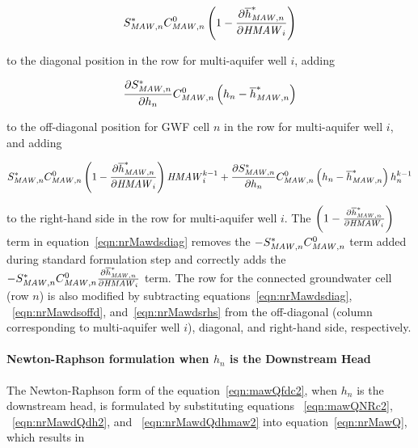 \begin{equation}
	\label{eqn:nrMawdsdiag}
	S_{\mathit{MAW},n}^* C_{\mathit{MAW},n}^0 \left( 1 - \frac{\partial \overline{h}^*_{\mathit{MAW},n}}{{\partial \mathit{HMAW}_i}} \right)
\end{equation}

\noindent to the diagonal position in the row for multi-aquifer well $i$, adding

\begin{equation}
	\label{eqn:nrMawdsoffd}
	\frac{\partial S_{\mathit{MAW},n}^*}{\partial h_n} C_{\mathit{MAW},n}^0 \left( h_n - \overline{h}^*_{\mathit{MAW},n} \right)
\end{equation}

\noindent to the off-diagonal position for GWF cell $n$ in the row for multi-aquifer well $i$, and adding

\begin{equation}
	\label{eqn:nrMawdsrhs}
	S_{\mathit{MAW},n}^* C_{\mathit{MAW},n}^0 \left( 1 - \frac{\partial \overline{h}^*_{\mathit{MAW},n}}{{\partial \mathit{HMAW}_i}} \right) \mathit{HMAW}_i^{k-1} + \frac{\partial S_{\mathit{MAW},n}^*}{\partial h_n} C_{\mathit{MAW},n}^0 \left( h_n - \overline{h}^*_{\mathit{MAW},n} \right) h_n^{k-1}
\end{equation}

\noindent to the right-hand side in the row for multi-aquifer well $i$. The $\left( 1 - \frac{\partial \overline{h}^*_{\mathit{MAW},n}}{{\partial \mathit{HMAW}_i}} \right)$ term in equation~\ref{eqn:nrMawdsdiag} removes the $-S_{\mathit{MAW},n}^* C_{\mathit{MAW},n}^0$ term added during standard formulation step and correctly adds the $-S_{\mathit{MAW},n}^* C_{\mathit{MAW},n}^0 \frac{\partial \overline{h}^*_{\mathit{MAW},n}}{{\partial \mathit{HMAW}_i}}$ term. The row for the connected groundwater cell (row $n$) is also modified by subtracting equations~\ref{eqn:nrMawdsdiag}, ~\ref{eqn:nrMawdsoffd}, and~\ref{eqn:nrMawdsrhs} from the off-diagonal (column corresponding to multi-aquifer well $i$), diagonal, and right-hand side, respectively.

\paragraph{Newton-Raphson formulation when $h_n$ is the Downstream Head}

The Newton-Raphson form of the equation~\ref{eqn:mawQfdc2}, when $h_n$ is the downstream head, is formulated by substituting equations ~\ref{eqn:mawQNRc2}, ~\ref{eqn:nrMawdQdh2}, and ~\ref{eqn:nrMawdQdhmaw2} into equation~\ref{eqn:nrMawQ}, which results in

